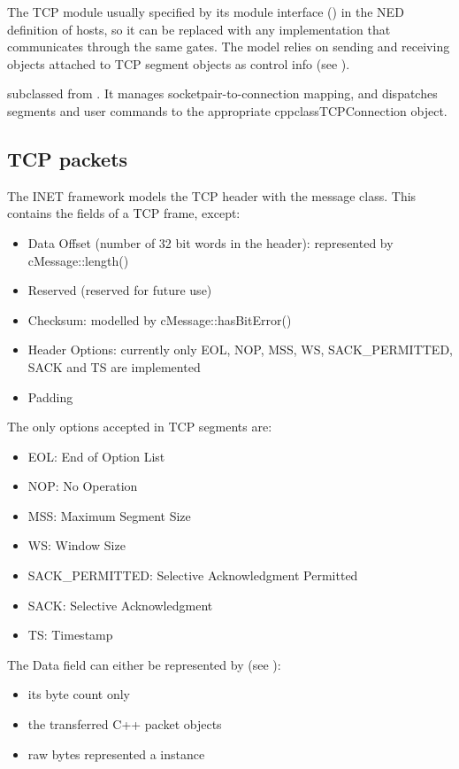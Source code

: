 The TCP module usually specified by its module interface
() in the NED definition of hosts, so it can be replaced with any implementation
that communicates through the same gates. The  model relies on
sending and receiving  objects
attached to TCP segment objects as control info (see ).

 subclassed from . It manages socketpair-to-connection
mapping, and dispatches segments and user commands to the appropriate cppclass{TCPConnection} object.

\subsection{TCP packets}

The INET framework models the TCP header with the  message class.
This contains the fields of a TCP frame, except:
\begin{itemize}
  \item Data Offset (number of 32 bit words in the header): represented by cMessage::length()
  \item Reserved (reserved for future use)
  \item Checksum: modelled by cMessage::hasBitError()
  \item Header Options: currently only EOL, NOP, MSS, WS, SACK\_PERMITTED, SACK and TS are implemented
  \item Padding
\end{itemize}

The only options accepted in TCP segments are:
\begin{itemize}
  \item EOL: End of Option List
  \item NOP: No Operation
  \item MSS: Maximum Segment Size
  \item WS: Window Size
  \item SACK\_PERMITTED: Selective Acknowledgment Permitted
  \item SACK: Selective Acknowledgment
  \item TS: Timestamp
\end{itemize}

The Data field can either be represented by (see ):
\begin{itemize}
  \item its byte count only
  \item the transferred C++ packet objects
  \item raw bytes represented a  instance
\end{itemize}

